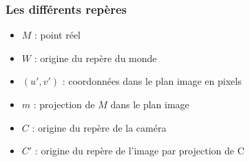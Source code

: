 \begin{frame}
\frametitle{Les différents repères}

\begin{minipage}[c]{0.48\linewidth}
  \centering
  \begin{overlayarea}{0.9\linewidth}{4cm}
    \hspace*{-1cm}
  \end{overlayarea}
\end{minipage}
\hfill
\begin{minipage}[c]{0.48\linewidth}
  \vspace*{\fill}
  \begin{itemize}
    \item<2-> $M$ : point réel
    \item<3-> $W$ : origine du repère du monde
    \item<4-> $(u', v')$ : coordonnées dans le plan image en pixels
    \item<5-> $m$ : projection de $M$ dans le plan image
    \item<6-> $C$ : origine du repère de la caméra
    \item<8-> $C'$ : origine du repère de l'image par projection de C
  \end{itemize}
  \vspace*{\fill}
\end{minipage}
\end{frame}

